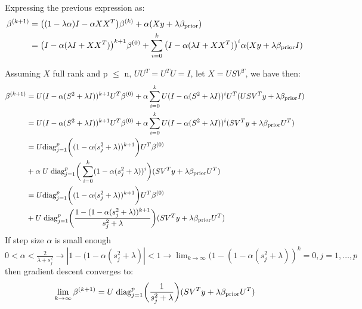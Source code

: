 \documentclass[12pt,twoside]{article}
\begin{document}
\begin{enumerate}
\begin{enumerate}
\medskip

Expressing the previous expression as:
\begin{align*}
		\beta^{(k+1)}	&=	\big( (1 - \lambda \alpha)  I - \alpha X X^T \big) \beta^{(k)}		+  	\alpha (X y + \lambda \beta_{\operatorname{prior}}) \\
					&=	\big(I - \alpha (\lambda I + X X^T)  \big)^{k+1} \beta^{(0)}		+	\sum_{i=0}^k \big(I - \alpha (\lambda I + X X^T)  \big)^i \alpha (X y + \lambda \beta_{\operatorname{prior}} I )
\end{align*}

Assuming $X$ full rank and p $\le$ n, $UU^T = U^TU = I$, let $X = USV^T$, we have then:
\begin{align*}
		\beta^{(k+1)}	&=	U (I - \alpha (S^2 + \lambda I))^{k+1} U^T \beta^{(0)}		+ \alpha \sum_{i=0}^k 	U (I - \alpha (S^2 + \lambda I))^ i U^T (U S V^T y +  \lambda \beta_{\operatorname{prior}} I) \\
					&=	U (I - \alpha (S^2 + \lambda I))^{k+1} U^T \beta^{(0)}		+ \alpha \sum_{i=0}^k 	U (I - \alpha (S^2 + \lambda I))^ i (S V^T y + \lambda \beta_{\operatorname{prior}}  U^T) \\
					&=	U \text{diag}_{j=1}^p \bigg( (1 - \alpha (s_j^2 + \lambda))^{k+1} \bigg)U^T \beta^{(0)}	\\
					&+ \alpha \; U  \;  \text{diag}_{j=1}^p \bigg( \sum_{i=0}^k (1 - \alpha (s_j^2 + \lambda))^i \bigg)  (S V^T y + \lambda \beta_{\operatorname{prior}}  U^T) \\
					&= U \text{diag}_{j=1}^p \bigg( (1 - \alpha (s_j^2 + \lambda))^{k+1} \bigg)U^T \beta^{(0)}	\\
					&+ U  \;  \text{diag}_{j=1}^p \bigg( \frac{ 1 - (1 - \alpha (s_j^2 + \lambda))^{k+1}} {s_j^2 + \lambda} \bigg)  (S V^T y + \lambda \beta_{\operatorname{prior}}  U^T)
\end{align*}
If step size $\alpha$ is small enough $0 < \alpha < \frac{2} {\lambda + s_j^2} \rightarrow |1 - (1 - \alpha (s_j^2 + \lambda)| < 1 \rightarrow \lim_{k \rightarrow \infty} (1 - (1 - \alpha (s_j^2 + \lambda))^k =0, j=1, \dots,p $ then gradient descent converges to:
$$\lim_{k \rightarrow \infty} \beta^{(k+1)} = U  \;  \text{diag}_{j=1}^p \bigg( \frac{1} {s_j^2 + \lambda} \bigg)  (S V^T y + \lambda \beta_{\operatorname{prior}}  U^T)$$



\end{enumerate}
\end{enumerate}
\end{document}
